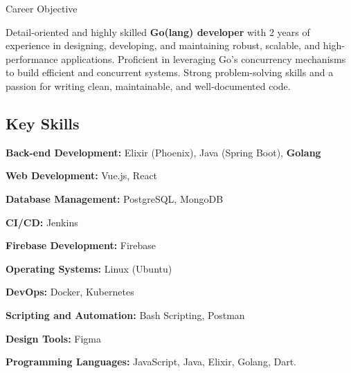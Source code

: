 \documentclass{resume} %
\begin{document}


\begin{rSection}{Career Objective}

    {Detail-oriented and highly skilled \textbf{Go(lang) developer} with 2 years of experience in designing, developing, and maintaining robust, scalable, and high-performance applications. Proficient in leveraging Go's concurrency mechanisms to build efficient and concurrent systems. Strong problem-solving skills and a passion for writing clean, maintainable, and well-documented code.  }
    
\subsection*{Key Skills}

 \hspace{5mm} \textbf{Back-end Development:} Elixir (Phoenix), Java (Spring Boot), \textbf{Golang}

 \hspace{5mm} \textbf{Web Development:} Vue.js, React

 \hspace{5mm} \textbf{Database Management:} PostgreSQL, MongoDB

 \hspace{5mm} \textbf{CI/CD:} Jenkins

 \hspace{5mm} \textbf{Firebase Development:} Firebase

 \hspace{5mm} \textbf{Operating Systems:} Linux (Ubuntu)

 \hspace{5mm} \textbf{DevOps:} Docker, Kubernetes

 \hspace{5mm} \textbf{Scripting and Automation:} Bash Scripting, Postman

 \hspace{5mm} \textbf{Design Tools:} Figma

 \hspace{5mm} \textbf{Programming Languages:} JavaScript, Java, Elixir, Golang, Dart.

\end{rSection}
\end{document}

